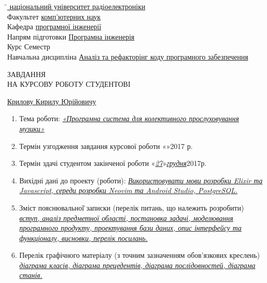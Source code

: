 \noindent\uline{̆ національний університет радіоелектроніки\hfill} \\
Факультет \uline{комп’ютерних наук\hfill} \\
Кафедра \uline{програмної інженерії\hfill} \\
Напрям підготовки \uline{Програмна інженерія\hfill} \\
Курс \uline{} Семестр \uline{\hfill} \\
\vspace*{\baselineskip}
Навчальна дисципліна \uline{Аналіз та рефакторінг коду програмного забезпечення}
\vspace*{\baselineskip}
\begin{center}
    ЗАВДАННЯ \\
    НА КУРСОВУ РОБОТУ СТУДЕНТОВІ
\end{center}
\noindent\uline{\hfill Крилову Кирилу Юрійовичу \hfill} \\
\begin{enumerate}
    \item Тема роботи: \uline{\textit{«Програмна система для колективного прослуховування музики»}\hfill}
    \item Термін узгодження завдання курсової роботи «\uline{\hspace{1em}}»\uline{\hfill}2017 р.
    \item Термін здачі студентом закінченої роботи  «\uline{\textit{27}}»\uline{\hfill\textit{грудня}\hfill}2017р.
    \item Вихідні дані до проекту (роботи): 
        \textit{\uline{
                Використовувати мови розробки Elixir та Javascript, середи розробки Neovim та Android Studio, PostgreSQL.\hfill
        }}
        \mbox{}
    \item Зміст пояснювальної̈ записки (перелік питань, що належить розробити) \\
        \textit{\uline{
                вступ, аналіз предметної області, постановка задачі, моделювання \hfill\mbox{}\\
                програмного продукту, проектування бази даних, опис інтерфейсу та функціоналу, висновки, перелік посилань.
                \hfill
        }}
        \mbox{}
    \item Перелік графічного матеріалу (з точним зазначенням обов’язкових креслень) \\ 
        \textit{\uline{
                діаграма класів, діаграма прецедентів, діаграма послідовностей, діаграма станів.
                \hfill
        }}
\end{enumerate}

\newpage
